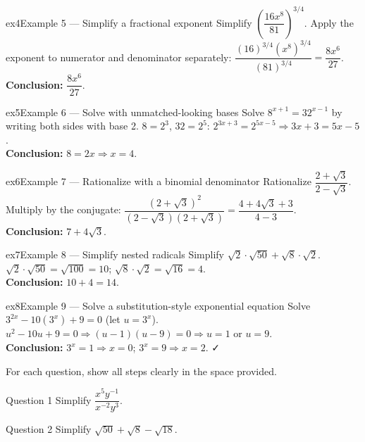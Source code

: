 \documentclass[11pt]{article}
\begin{document}
\begin{example}{ex4}{Example 5 --- Simplify a fractional exponent}
Simplify $\left(\dfrac{16x^8}{81}\right)^{3/4}$.\soln
Apply the exponent to numerator and denominator separately: $\dfrac{(16)^{3/4}(x^8)^{3/4}}{(81)^{3/4}}=\dfrac{8x^6}{27}$.\\[3pt]\textbf{Conclusion:} $\dfrac{8x^6}{27}$.
\end{example}

\begin{example}{ex5}{Example 6 --- Solve with unmatched-looking bases}
Solve $8^{x+1}=32^{x-1}$ by writing both sides with base 2.\soln
$8=2^3$, $32=2^5$: $2^{3x+3}=2^{5x-5}\Rightarrow3x+3=5x-5$.\\[3pt]\textbf{Conclusion:} $8=2x\Rightarrow x=4$.
\end{example}

\begin{example}{ex6}{Example 7 --- Rationalize with a binomial denominator}
Rationalize $\dfrac{2+\sqrt3}{2-\sqrt3}$.\soln
Multiply by the conjugate: $\dfrac{(2+\sqrt3)^2}{(2-\sqrt3)(2+\sqrt3)}=\dfrac{4+4\sqrt3+3}{4-3}$.\\[3pt]\textbf{Conclusion:} $7+4\sqrt3$.
\end{example}

\begin{example}{ex7}{Example 8 --- Simplify nested radicals}
Simplify $\sqrt{2}\cdot\sqrt{50}+\sqrt{8}\cdot\sqrt{2}$.\soln
$\sqrt2\cdot\sqrt{50}=\sqrt{100}=10$; $\sqrt8\cdot\sqrt2=\sqrt{16}=4$.\\[3pt]\textbf{Conclusion:} $10+4=14$.
\end{example}

\begin{example}{ex8}{Example 9 --- Solve a substitution-style exponential equation}
Solve $3^{2x}-10(3^x)+9=0$ (let $u=3^x$).\soln
$u^2-10u+9=0\Rightarrow(u-1)(u-9)=0\Rightarrow u=1$ or $u=9$.\\[3pt]
\textbf{Conclusion:} $3^x=1\Rightarrow x=0$; $3^x=9\Rightarrow x=2$. ✓
\end{example}

\clearpage
{}
For each question, show all steps clearly in the space provided.

\begin{qbox}{Question 1}
Simplify $\dfrac{x^5y^{-1}}{x^{-2}y^3}$.\workspace{2.4cm}
\end{qbox}

\begin{qbox}{Question 2}
Simplify $\sqrt{50}+\sqrt{8}-\sqrt{18}$.\workspace{2.4cm}
\end{qbox}
\end{document}
